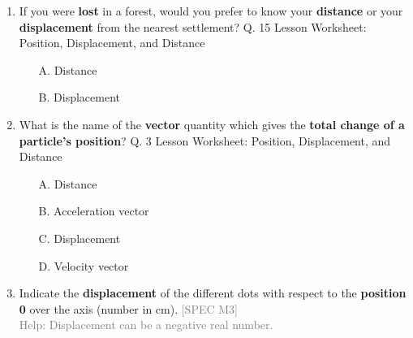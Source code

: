 \documentclass[A4,12pt]{article}
\begin{document}
\begin{enumerate}[label=\bfseries (\arabic*)]
\item If you were \textbf{lost} in a forest, would you prefer to know your \textbf{distance} or your \textbf{displacement} from the nearest settlement? \cite{Nagwa} Q. 15 Lesson Worksheet: Position, Displacement, and Distance
%
\begin{multicols}{2}
\begin{itemize}
    \item[A.] Distance
    \item[B.] Displacement
\end{itemize}
\end{multicols}










\item What is the name of the \textbf{vector} quantity which gives the \textbf{total change of a particle’s position}? \cite{Nagwa} Q. 3 Lesson Worksheet: Position, Displacement, and Distance
%
\begin{multicols}{2}
\begin{itemize}
    \item[A.] Distance
    \item[B.] Acceleration vector
    \item[C.] Displacement
    \item[D.] Velocity vector
\end{itemize}
\end{multicols}














\item \label{Pos}Indicate the \textbf{displacement} of the different dots with respect to the \textbf{position 0} over the axis (number in cm). \textcolor{gray}{[SPEC M3]} \cite{Triguero}\\
\textcolor{gray}{Help: Displacement can be a negative real number.}


\end{enumerate}
\end{document}
